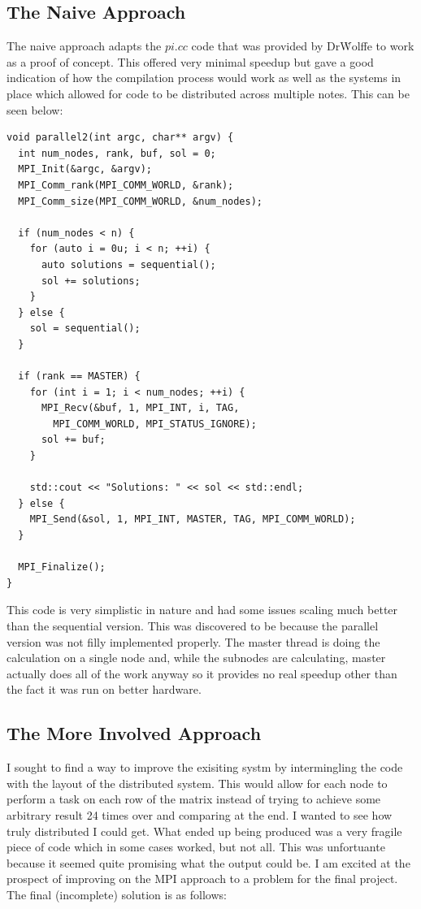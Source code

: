 \documentclass[11pt]{article}
\begin{document}
\subsection{The Naive Approach}
The naive approach adapts the $pi.cc$ code that was provided by Dr\. Wolffe to work as a proof of concept. This offered very minimal speedup but gave a good indication of how
the compilation process would work as well as the systems in place which allowed for code to be distributed across multiple notes. This can be seen below:
\lstset{frame=tb,language=c++}
\begin{lstlisting}
void parallel2(int argc, char** argv) {
  int num_nodes, rank, buf, sol = 0;
  MPI_Init(&argc, &argv);
  MPI_Comm_rank(MPI_COMM_WORLD, &rank);
  MPI_Comm_size(MPI_COMM_WORLD, &num_nodes);

  if (num_nodes < n) {
    for (auto i = 0u; i < n; ++i) {
      auto solutions = sequential();
      sol += solutions;
    }
  } else {
    sol = sequential();
  }

  if (rank == MASTER) {
    for (int i = 1; i < num_nodes; ++i) {
      MPI_Recv(&buf, 1, MPI_INT, i, TAG,
        MPI_COMM_WORLD, MPI_STATUS_IGNORE);
      sol += buf;
    }

    std::cout << "Solutions: " << sol << std::endl;
  } else {
    MPI_Send(&sol, 1, MPI_INT, MASTER, TAG, MPI_COMM_WORLD);
  }

  MPI_Finalize();
}
\end{lstlisting}
This code is very simplistic in nature and had some issues scaling much better than the sequential version. This was discovered to be because the parallel version was not filly implemented properly. The master thread is doing the calculation on a single node and, while the subnodes are calculating, master actually does all of the work anyway so it provides no real speedup other than the fact it was run on better hardware.

\subsection{The More Involved Approach}
I sought to find a way to improve the exisiting systm by intermingling the code with the layout of the distributed system. This would allow for each node to perform a task on each row of the matrix instead of trying to achieve some arbitrary result 24 times over and comparing at the end. I wanted to see how truly distributed I could get. What ended up being produced was a very fragile piece of code which in some cases worked, but not all. This was unfortuante because it seemed quite promising what the output could be. I am excited at the prospect of improving on the MPI approach to a problem for the final project. The final (incomplete) solution is as follows:
\end{document}
